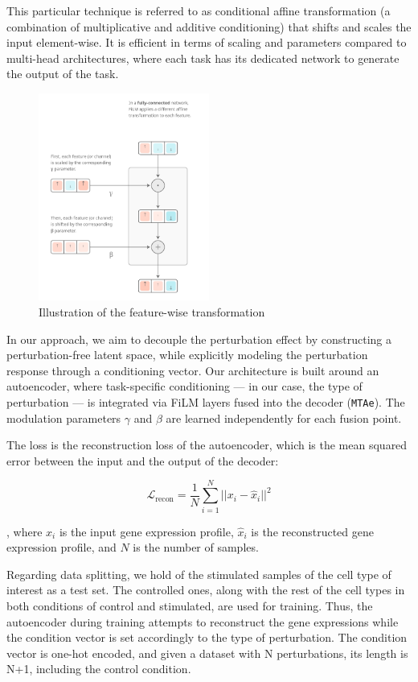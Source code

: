 \documentclass[12pt, a4paper]{article}
\begin{document}
This particular technique is referred to as conditional affine transformation (a combination of multiplicative and additive conditioning) that shifts and scales the input element-wise. It is efficient in terms of scaling and parameters compared to multi-head architectures, where each task has its dedicated network to generate the output of the task.


\begin{figure}[h!]
    \centering
    \includegraphics[width=0.5\textwidth]{film_layers.png}
    \caption{Illustration of the feature-wise transformation \cite{dumoulin2018feature-wise}}
    \label{fig:film}
\end{figure}

In our approach, we aim to decouple the perturbation effect by constructing a perturbation-free latent space, while explicitly modeling the perturbation response through a conditioning vector. Our architecture is built around an autoencoder, where task-specific conditioning — in our case, the type of perturbation — is integrated via FiLM layers fused into the decoder (\verb|MTAe|). The modulation parameters $\gamma$ and $\beta$ are learned independently for each fusion point.

The loss is the reconstruction loss of the autoencoder, which is the mean squared error between the input and the output of the decoder:

\[
\mathcal{L}_{\text{recon}} = \frac{1}{N} \sum_{i=1}^{N} ||x_i - \hat{x}_i||^2 \]


, where $x_i$ is the input gene expression profile, $\hat{x}_i$ is the reconstructed gene expression profile, and $N$ is the number of samples.

Regarding data splitting, we hold of the stimulated samples of the cell type of interest as a test set. The controlled ones, along with the rest of the cell types in both conditions of control and stimulated, are used for training. Thus, the autoencoder during training attempts to reconstruct the gene expressions while the condition vector is set accordingly to the type of perturbation. The condition vector is one-hot encoded, and given a dataset with N perturbations, its length is N+1, including the control condition.
\end{document}
